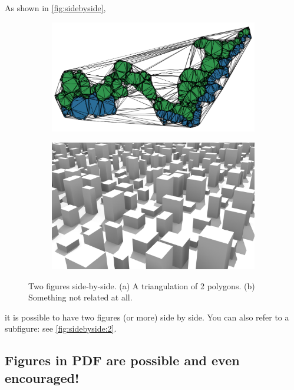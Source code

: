 As shown in \autoref{fig:sidebyside},
\begin{figure}
  \centering
  \begin{subfigure}[b]{0.3\linewidth}
    \centering
    \includegraphics[angle=90,width=\linewidth]{figs/sometriangles.png}
    \caption{}\label{fig:sidebyside:1}
  \end{subfigure}%
  \qquad %
  \begin{subfigure}[b]{0.6\linewidth}
    \centering
    \includegraphics[width=\linewidth]{figs/lod1.png}
    \caption{}\label{fig:sidebyside:2}
  \end{subfigure}%
  \caption[Shortened title for the list of figures]{Two figures side-by-side. (a) A triangulation of 2 polygons. (b) Something not related at all.}
\label{fig:sidebyside}
\end{figure}
it is possible to have two figures (or more) side by side.
You can also refer to a subfigure: see \autoref{fig:sidebyside:2}.


\subsection[Shorter section name for the TOC]{Figures in PDF are possible and even encouraged!}
\label{sec:pdf}


